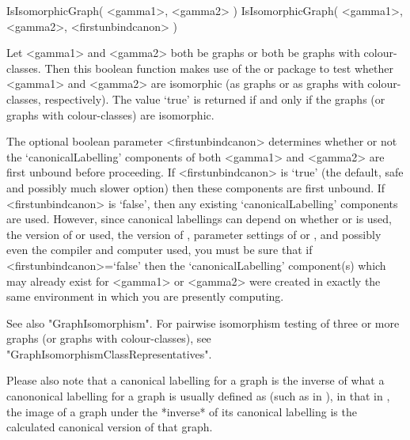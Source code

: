 
\>IsIsomorphicGraph( <gamma1>, <gamma2> )
\>IsIsomorphicGraph( <gamma1>, <gamma2>, <firstunbindcanon> )

Let <gamma1> and <gamma2> both be graphs or both be graphs with
colour-classes.  Then this boolean function makes use of the {\nauty} or 
{\bliss} package to test whether <gamma1> and <gamma2> are isomorphic 
(as graphs or as graphs with colour-classes, respectively). The
value `true' is returned if and only if the graphs (or graphs with
colour-classes) are isomorphic.

The optional boolean parameter <firstunbindcanon> determines whether or
not the `canonicalLabelling' components of both <gamma1> and <gamma2>
are first unbound before proceeding.  If <firstunbindcanon> is `true'
(the default, safe and possibly much slower option) then these components
are first unbound.  If <firstunbindcanon> is `false', then any existing
`canonicalLabelling' components are used.  However, since canonical
labellings can depend on whether {\nauty} or {\bliss} is used, the version
of {\nauty} or {\bliss} used, the version of {\GRAPE}, parameter settings
of {\nauty} or {\bliss}, and possibly even the compiler and computer
used, you must be sure that if <firstunbindcanon>=`false' then the
`canonicalLabelling' component(s) which may already exist for <gamma1>
or <gamma2> were created in exactly the same environment in which you
are presently computing.

See also "GraphIsomorphism".  For pairwise isomorphism testing
of three or more graphs (or graphs with colour-classes), see
"GraphIsomorphismClassRepresentatives".

Please also note that a canonical labelling for a {\GRAPE} graph is the
inverse of what a canononical labelling for a graph is usually defined as
(such as in {\bliss}), in that in {\GRAPE}, the image of a graph under
the *inverse* of its canonical labelling is the calculated canonical
version of that graph.

